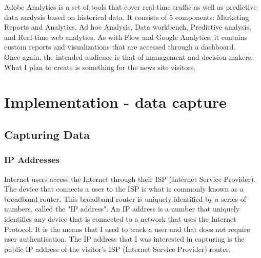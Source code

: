 \documentclass[12pt]{article}
\begin{document}
Adobe Analytics is a set of tools that cover real-time traffic as well as predictive data analysis based on historical data. It consists of 5 components: Marketing Reports and Analytics, Ad hoc Analysis, Data workbench, Predictive analysis, and Real-time web analytics. As with Flow and Google Analytics, it contains custom reports and visualizations that are accessed through a dashboard. \\

\noindent Once again, the intended audience is that of management and decision makers. What I plan to create is something for the news site visitors.

\vfill


\section{Implementation - data capture}
\subsection{Capturing Data}
\subsubsection{IP Addresses}
Internet users access the Internet through their ISP (Internet Service Provider). The device that connects a user to the ISP is what is commonly known as a broadband router. This broadband router is uniquely identified by a series of numbers, called the "IP address". An IP address is a number that uniquely identifies any device that is connected to a network that uses the Internet Protocol. It is the means that I used to track a user and that does not require user authentication. The IP address that I was interested in capturing is the public IP address of the visitor's ISP (Internet Service Provider) router. 
\end{document}
